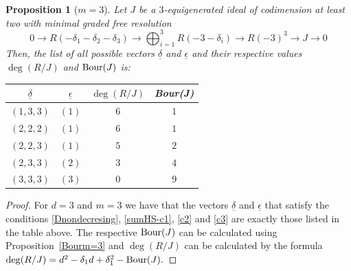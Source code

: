 \documentclass[11pt]{amsart} %
\newtheorem{Proposition}[Theorem]{Proposition}
\theoremstyle{definition}
\begin{document}
\begin{Proposition}[$m=3$]
	Let $J$ be a $3$-equigenerated ideal of codimension at least two with minimal graded free resolution
	\begin{equation}
		0\to R(-\delta_1-\delta_2-\delta_3)\to \bigoplus_{i=1}^3 R(-3-\delta_i)\to R(-3)^3\to J\to 0
	\end{equation}
	Then, the list of all possible vectors $\underline{\delta}$ and $\underline{\epsilon}$ and their respective values $\deg(R/J)$ and ${\rm Bour}(J)$ is:
	\begin{table}[H]
		\begin{center}
			\begin{tabular}{|c|c|c|c|}
				\hline
				$\underline{\delta}$&$\underline{\epsilon}$&$\deg(R/J)$&{\rm Bour}(J)\\
				\hline
				$(1,3,3)$&$(1)$&$6$&$1$\\
				$(2,2,2)$&$(1)$&$6$&$1$\\
				$(2,2,3)$&$(1)$&$5$&$2$\\
				$(2,3,3)$&$(2)$&$3$&$4$\\
				$(3,3,3)$&$(3)$&$0$&$9$\\
				\hline
					\end{tabular}
			\end{center}
		\end{table}
				\end{Proposition}
			\begin{proof} For $d=3$ and $m=3$ we have that the vectors $\underline{\delta}$ and  $\underline{\epsilon}$ that  satisfy the conditions \eqref{Dnondecresing}, \eqref{sumHS-c1}, \eqref{c2} and \eqref{c3} are exactly those listed in the table above. The respective ${\rm Bour}(J)$ can be calculated using Proposition~\ref{Bourm=3} and $\deg(R/J)$ can be calculated by the formula $\deg(R/J)=d^2-\delta_1d+\delta_1^2-{\rm Bour}(J).$
					\end{proof}
		
\end{document}
